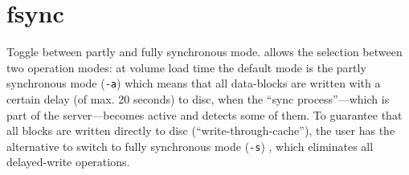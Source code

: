 \section{fsync}
\begin{man}
  \PP Toggle between partly and fully synchronous mode.
   allows the selection between two operation modes: at volume
             load time the default mode is the partly synchronous mode ({\tt -a})
             which means that all data-blocks are written with a certain delay
             (of max. 20 seconds) to disc, when the ``sync process''---which is
             part of the server---becomes active and detects some of them. To
             guarantee that all blocks are written directly to disc
             (``write-through-cache''), the user has the alternative to switch to
             fully synchronous mode ({\tt -s}) , which eliminates all delayed-write
             operations.
\end{man}
